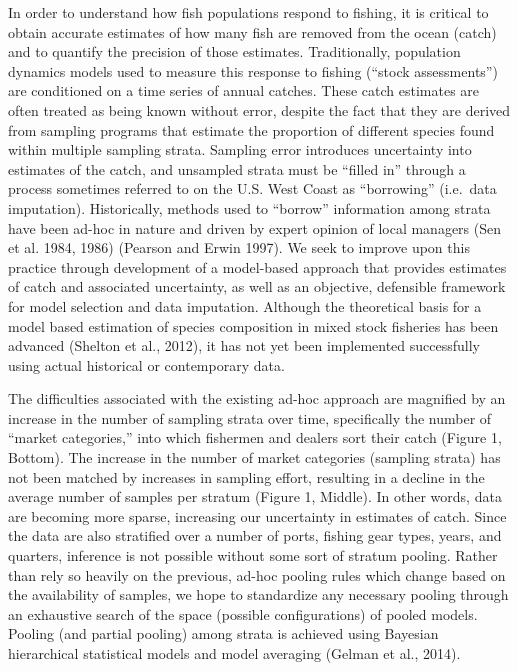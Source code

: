 In order to understand how fish populations respond to fishing, it is
critical to obtain accurate estimates of how many fish are removed from
the ocean (catch) and to quantify the precision of those estimates.
Traditionally, population dynamics models used to measure this response
to fishing (``stock assessments'') are conditioned on a time series of
annual catches. These catch estimates are often treated as being known
without error, despite the fact that they are derived from sampling
programs that estimate the proportion of different species found within
multiple sampling strata. Sampling error introduces uncertainty into
estimates of the catch, and unsampled strata must be ``filled in''
through a process sometimes referred to on the U.S. West Coast as
``borrowing'' (i.e.~data imputation). Historically, methods used to
``borrow'' information among strata have been ad-hoc in nature and
driven by expert opinion of local managers (Sen et al. 1984, 1986)
(Pearson and Erwin 1997). We seek to improve upon this practice through
development of a model-based approach that provides estimates of catch
and associated uncertainty, as well as an objective, defensible
framework for model selection and data imputation. Although the
theoretical basis for a model based estimation of species composition in
mixed stock fisheries has been advanced (Shelton et al., 2012), it has
not yet been implemented successfully using actual historical or
contemporary data.

The difficulties associated with the existing ad-hoc approach are
magnified by an increase in the number of sampling strata over time,
specifically the number of ``market categories,'' into which fishermen
and dealers sort their catch (Figure 1, Bottom). The increase in the
number of market categories (sampling strata) has not been matched by
increases in sampling effort, resulting in a decline in the average
number of samples per stratum (Figure 1, Middle). In other words, data
are becoming more sparse, increasing our uncertainty in estimates of
catch. Since the data are also stratified over a number of ports,
fishing gear types, years, and quarters, inference is not possible
without some sort of stratum pooling. Rather than rely so heavily on the
previous, ad-hoc pooling rules which change based on the availability of
samples, we hope to standardize any necessary pooling through an
exhaustive search of the space (possible configurations) of pooled
models. Pooling (and partial pooling) among strata is achieved using
Bayesian hierarchical statistical models and model averaging (Gelman et
al., 2014).

